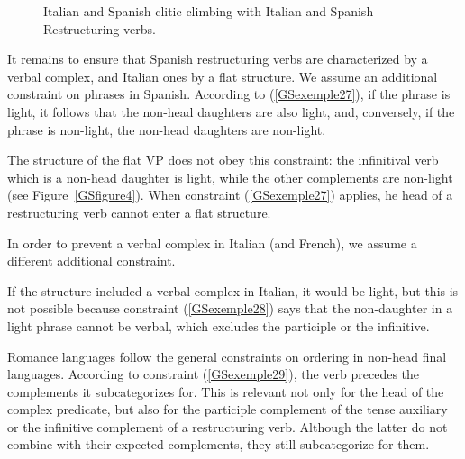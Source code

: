 \documentclass[output=paper
	        ,collection
	        ,collectionchapter
 	        ,biblatex
                ,babelshorthands
                ,newtxmath
                ,draftmode
                ,colorlinks, citecolor=brown
]{langscibook}
\begin{document}
{\begin{figure}
\begin{subfigure}[b]{\textwidth}
\label{GSfigure6b}
\end{subfigure}
\caption{Italian and Spanish clitic climbing with Italian and Spanish Restructuring verbs.}
\label{GSfigure6}
\end{figure}

It remains to ensure that Spanish restructuring verbs are characterized by a verbal complex, and Italian ones by a flat structure. We assume an additional constraint on phrases in Spanish. According to (\ref{GSexemple27}), if the phrase is light, it follows that the non-head daughters are also light, and, conversely, if the phrase is non-light, the non-head daughters are non-light.

\begin{exe}
\end{exe}
The structure of the flat VP does not obey this constraint: the infinitival verb which is a non-head daughter is light, while the other complements are non-light (see Figure~\ref{GSfigure4}). When constraint (\ref{GSexemple27}) applies, he head of a restructuring verb cannot enter a flat structure. 

In order to prevent a verbal complex in Italian (and French), we assume a different additional constraint.

\begin{exe}
\end{exe}

If the structure included a verbal complex in Italian, it would be light, but this is not possible because constraint (\ref{GSexemple28}) says that the non-daughter in a light phrase cannot be verbal, which excludes the participle or the infinitive.

Romance languages follow the general constraints on ordering in non-head final languages. According to constraint (\ref{GSexemple29}), the verb precedes the complements it subcategorizes for. This is relevant not only for the head of the complex predicate, but also for the participle complement of the tense auxiliary or the infinitive complement of a restructuring verb. Although the latter do not combine with their expected complements, they still subcategorize for them.  

}
\end{document}
